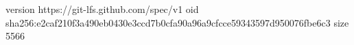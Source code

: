 version https://git-lfs.github.com/spec/v1
oid sha256:e2caf210f3a490eb0430e3ccd7b0cfa90a96a9cfcce59343597d950076fbe6c3
size 5566
